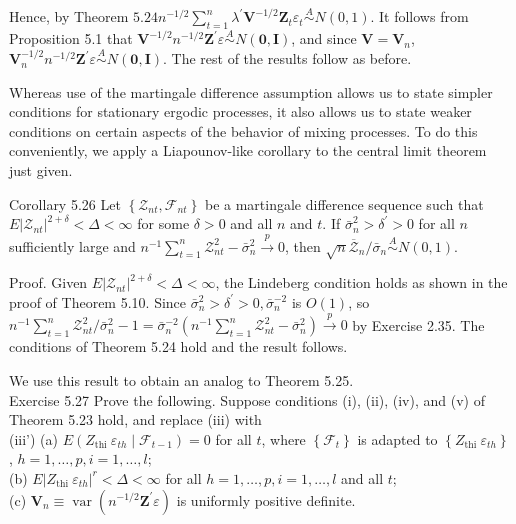 \documentclass[10pt]{article}
\begin{document}
Hence, by Theorem $5.24 n^{-1 / 2} \sum_{t=1}^{n} \lambda^{\prime} \mathbf{V}^{-1 / 2} \mathbf{Z}_{t} \varepsilon_{t} \stackrel{A}{\sim} N(0,1)$. It follows from Proposition 5.1 that $\mathbf{V}^{-1 / 2} n^{-1 / 2} \mathbf{Z}^{\prime} \varepsilon \stackrel{A}{\sim} N(\mathbf{0}, \mathbf{I})$, and since $\mathbf{V}=\mathbf{V}_{n}$, $\mathbf{V}_{n}^{-1 / 2} n^{-1 / 2} \mathbf{Z}^{\prime} \varepsilon \stackrel{A}{\sim} N(\mathbf{0}, \mathbf{I})$. The rest of the results follow as before.

Whereas use of the martingale difference assumption allows us to state simpler conditions for stationary ergodic processes, it also allows us to state weaker conditions on certain aspects of the behavior of mixing processes. To do this conveniently, we apply a Liapounov-like corollary to the central limit theorem just given.

Corollary 5.26 Let $\left\{\mathcal{Z}_{n t}, \mathcal{F}_{n t}\right\}$ be a martingale difference sequence such that $E\left|\mathcal{Z}_{n t}\right|^{2+\delta}<\Delta<\infty$ for some $\delta>0$ and all $n$ and $t$. If $\bar{\sigma}_{n}^{2}>\delta^{\prime}>0$ for all $n$ sufficiently large and $n^{-1} \sum_{t=1}^{n} \mathcal{Z}_{n t}^{2}-\bar{\sigma}_{n}^{2} \xrightarrow{p} 0$, then $\sqrt{n} \overline{\mathcal{Z}}_{n} / \bar{\sigma}_{n} \stackrel{A}{\sim} N(0,1)$.

Proof. Given $E\left|\mathcal{Z}_{n t}\right|^{2+\delta}<\Delta<\infty$, the Lindeberg condition holds as shown in the proof of Theorem 5.10. Since $\bar{\sigma}_{n}^{2}>\delta^{\prime}>0, \bar{\sigma}_{n}^{-2}$ is $O(1)$, so $n^{-1} \sum_{t=1}^{n} \mathcal{Z}_{n t}^{2} / \bar{\sigma}_{n}^{2}-1=\bar{\sigma}_{n}^{-2}\left(n^{-1} \sum_{t=1}^{n} \mathcal{Z}_{n t}^{2}-\bar{\sigma}_{n}^{2}\right) \xrightarrow{p} 0$ by Exercise 2.35. The conditions of Theorem 5.24 hold and the result follows.

We use this result to obtain an analog to Theorem 5.25.\\
Exercise 5.27 Prove the following. Suppose conditions (i), (ii), (iv), and (v) of Theorem 5.23 hold, and replace (iii) with\\
(iii') (a) $E\left(Z_{\text {thi }} \varepsilon_{t h} \mid \mathcal{F}_{t-1}\right)=0$ for all $t$, where $\left\{\mathcal{F}_{t}\right\}$ is adapted to $\left\{Z_{\text {thi }} \varepsilon_{t h}\right\}$, $h=1, \ldots, p, i=1, \ldots, l$;\\
(b) $E\left|Z_{\text {thi }} \varepsilon_{t h}\right|^{r}<\Delta<\infty$ for all $h=1, \ldots, p, i=1, \ldots, l$ and all $t$;\\
(c) $\mathbf{V}_{n} \equiv \operatorname{var}\left(n^{-1 / 2} \mathbf{Z}^{\prime} \varepsilon\right)$ is uniformly positive definite.
\end{document}
